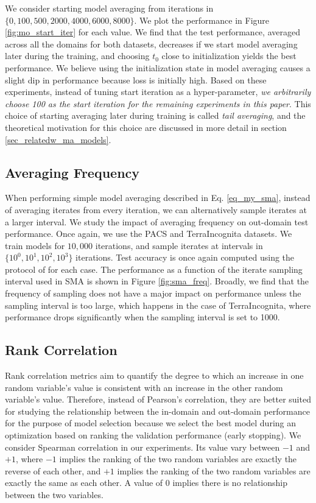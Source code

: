 We consider starting model averaging from iterations in $\{0, 100, 500, 2000, 4000, 6000, 8000\}$. We plot the performance in Figure \ref{fig:mo_start_iter} for each value. We find that the test performance, averaged across all the domains for both datasets, decreases if we start model averaging later during the training, and choosing $t_0$ close to initialization yields the best performance. We believe using the initialization state in model averaging causes a slight dip in performance because loss is initially high. Based on these experiments, instead of tuning start iteration as a hyper-parameter, \textit{we arbitrarily choose 100 as the start iteration for the remaining experiments in this paper}. This choice of starting averaging later during training is called \textit{tail averaging}, and the theoretical motivation for this choice are discussed in more detail in section \ref{sec_relatedw_ma_models}.

\subsection{Averaging Frequency}
\label{sec_freq_analysis}

When performing simple model averaging described in Eq. \ref{eq_my_sma}, instead of averaging iterates from every iteration, we can alternatively sample iterates at a larger interval. We study the impact of averaging frequency on out-domain test performance. Once again, we use the PACS and TerraIncognita datasets. We train models for $10,000$ iterations, and sample iterates at intervals in $\{10^0, 10^1, 10^2, 10^3\}$ iterations. Test accuracy is once again computed using the protocol of \cite{gulrajani2020search} for each case. The performance as a function of the iterate sampling interval used in SMA is shown in Figure \ref{fig:sma_freq}. Broadly, we find that the frequency of sampling does not have a major impact on performance unless the sampling interval is too large, which happens in the case of TerraIncognita, where performance drops significantly when the sampling interval is set to 1000.





\subsection{Rank Correlation}
\label{sec_rank_corr_intro}
Rank correlation metrics aim to quantify the degree to which an increase in one random variable's value is consistent with an increase in the other random variable's value. Therefore, instead of Pearson's correlation, they are better suited for studying the relationship between the in-domain and out-domain performance for the purpose of model selection because we select the best model during an optimization based on ranking the validation performance (early stopping). We consider Spearman correlation in our experiments. Its value vary between $-1$ and $+1$, where $-1$ implies the ranking of the two random variables are exactly the reverse of each other, and $+1$ implies the ranking of the two random variables are exactly the same as each other. A value of $0$ implies there is no relationship between the two variables.

